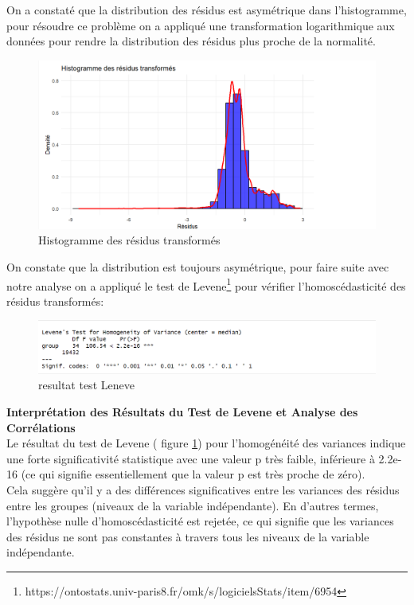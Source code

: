 \documentclass{report}
\begin{document}
On a constaté que la distribution des résidus est asymétrique dans l'histogramme, pour résoudre ce problème on a appliqué une transformation logarithmique aux données pour rendre la distribution des résidus plus proche de la normalité.\\
\begin{figure}[H]
\centering
\includegraphics[width = 1
\linewidth]{residustransf.png}
\caption{Histogramme des résidus transformés}
\end{figure}

On constate que la distribution est toujours asymétrique, pour faire suite avec notre analyse on a appliqué le test de Levene\footnote{https://ontostats.univ-paris8.fr/omk/s/logicielsStats/item/6954} \cite{o2002levene} pour vérifier l'homoscédasticité des résidus transformés:\\
 

\begin{figure}[H]
\centering
\includegraphics[width = 1
\linewidth]{leneve.png}
\caption{resultat test Leneve}\label{leneve}
\end{figure}

\Large\textbf{Interprétation des Résultats du Test de Levene et Analyse des Corrélations}\\
Le résultat du test de Levene ( figure \ref{leneve}) pour l'homogénéité des variances indique une forte significativité statistique avec une valeur p très faible, inférieure à 2.2e-16 (ce qui signifie essentiellement que la valeur p est très proche de zéro).\\

Cela suggère qu'il y a des différences significatives entre les variances des résidus entre les groupes (niveaux de la variable indépendante). En d'autres termes, l'hypothèse nulle d'homoscédasticité est rejetée, ce qui signifie que les variances des résidus ne sont pas constantes à travers tous les niveaux de la variable indépendante.\\
\end{document}
